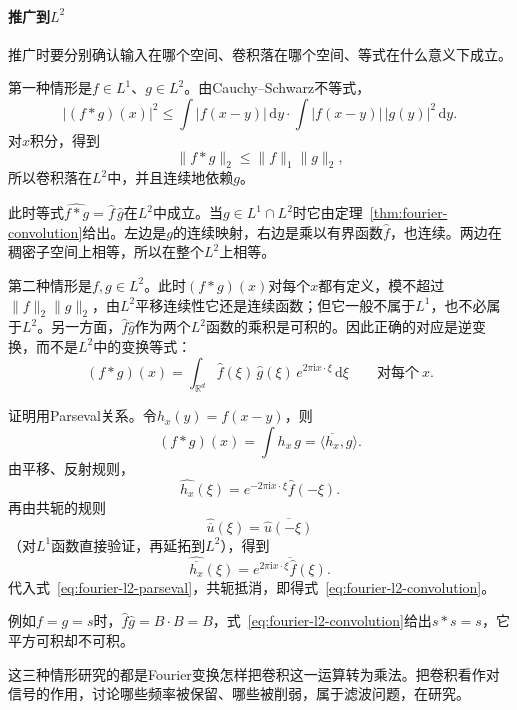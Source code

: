 \paragraph{推广到$L^2$}

推广时要分别确认输入在哪个空间、卷积落在哪个空间、等式在什么意义下成立。

第一种情形是$f\in L^1$、$g\in L^2$。由Cauchy--Schwarz不等式，
\[
\lvert(f*g)(x)\rvert^2\leq\int\lvert f(x-y)\rvert\,\mathrm dy\cdot\int\lvert f(x-y)\rvert\,\lvert g(y)\rvert^2\,\mathrm dy.
\]
对$x$积分，得到
\[
\lVert f*g\rVert_2\leq\lVert f\rVert_1\lVert g\rVert_2,
\]
所以卷积落在$L^2$中，并且连续地依赖$g$。

此时等式$\widehat{f*g}=\widehat f\,\widehat g$在$L^2$中成立。当$g\in L^1\cap L^2$时它由定理~\ref{thm:fourier-convolution}给出。左边是$g$的连续映射，右边是乘以有界函数$\widehat f$，也连续。两边在稠密子空间上相等，所以在整个$L^2$上相等。

第二种情形是$f,g\in L^2$。此时$(f*g)(x)$对每个$x$都有定义，模不超过$\lVert f\rVert_2\lVert g\rVert_2$，由$L^2$平移连续性它还是连续函数；但它一般不属于$L^1$，也不必属于$L^2$。另一方面，$\widehat f\widehat g$作为两个$L^2$函数的乘积是可积的。因此正确的对应是逆变换，而不是$L^2$中的变换等式：
\begin{equation}
(f*g)(x)=\int_{\mathbb R^d}\widehat f(\xi)\,\widehat g(\xi)\,e^{2\pi\mathrm ix\cdot\xi}\,\mathrm d\xi\qquad\text{对每个}\ x .
\label{eq:fourier-l2-convolution}
\end{equation}

证明用Parseval关系。令$h_x(y)=f(x-y)$，则
\[
(f*g)(x)=\int h_x\,g=\langle\overline{h_x},g\rangle.
\]
由平移、反射规则，
\[
\widehat{h_x}(\xi)=e^{-2\pi\mathrm ix\cdot\xi}\widehat f(-\xi).
\]
再由共轭的规则
\[
\widehat{\overline u}(\xi)=\overline{\widehat u(-\xi)}
\]
（对$L^1$函数直接验证，再延拓到$L^2$），得到
\[
\widehat{\overline{h_x}}(\xi)=\overline{e^{2\pi\mathrm ix\cdot\xi}\widehat f(\xi)}.
\]
代入式~\eqref{eq:fourier-l2-parseval}，共轭抵消，即得式~\eqref{eq:fourier-l2-convolution}。

例如$f=g=s$时，$\widehat f\widehat g=B\cdot B=B$，式~\eqref{eq:fourier-l2-convolution}给出$s*s=s$，它平方可积却不可积。

这三种情形研究的都是Fourier变换怎样把卷积这一运算转为乘法。把卷积看作对信号的作用，讨论哪些频率被保留、哪些被削弱，属于滤波问题，在研究。
